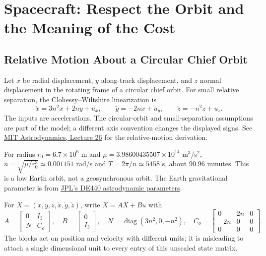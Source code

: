\section{Spacecraft: Respect the Orbit and the Meaning of the Cost}

\subsection{Relative Motion About a Circular Chief Orbit}

Let $x$ be radial displacement, $y$ along-track displacement, and $z$ normal displacement in the rotating frame of a circular chief orbit. For small relative separation, the Clohessy--Wiltshire linearization is
\begin{equation}
 \ddot x=3n^2x+2n\dot y+u_x,\qquad
 \ddot y=-2n\dot x+u_y,\qquad
 \ddot z=-n^2z+u_z.
\end{equation}
The inputs are accelerations. The circular-orbit and small-separation assumptions are part of the model; a different axis convention changes the displayed signs. See \href{https://ocw.mit.edu/courses/16-346-astrodynamics-fall-2008/e4f0632a9f1c98f7e9b25492e1a30eb1_lec_26.pdf}{MIT Astrodynamics, Lecture 26} for the relative-motion derivation.

For radius $r_0=6.7\times10^6$ m and $\mu=3.98600435507\times10^{14}$ m$^3$/s$^2$, $n=\sqrt{\mu/r_0^3}\simeq0.001151$ rad/s and $T=2\pi/n\simeq5458$ s, about $90.96$ minutes. This is a low Earth orbit, not a geosynchronous orbit. The Earth gravitational parameter is from \href{https://ssd.jpl.nasa.gov/astro_par.html}{JPL's DE440 astrodynamic parameters}.

For $X=(x,y,z,\dot x,\dot y,\dot z)$, write $\dot X=A X+B u$ with
\begin{equation}
 A=\begin{bmatrix}0&I_3\\N&C_o\end{bmatrix},\quad B=\begin{bmatrix}0\\I_3\end{bmatrix},\quad
 N=\operatorname{diag}(3n^2,0,-n^2),\quad
 C_o=\begin{bmatrix}0&2n&0\\-2n&0&0\\0&0&0\end{bmatrix}.
\end{equation}
The blocks act on position and velocity with different units; it is misleading to attach a single dimensional unit to every entry of this unscaled state matrix.

